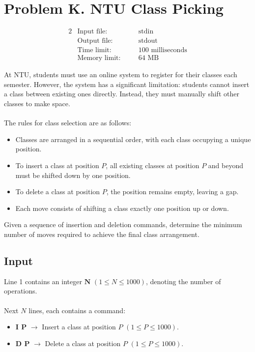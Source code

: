 \documentclass[12pt,a4paper]{article}
\begin{document}
\newpage

\section*{\fontsize{18}{12}Problem K. NTU Class Picking}

\begin{alignat*} {2}
 &   \text{Input file:}   \quad     &&\text{stdin}\\
 &   \text{Output file:}  \quad     &&\text{stdout}\\
 &   \text{Time limit:}   \quad     &&\text{100 milliseconds}\\
 &   \text{Memory limit:} \quad     &&\text{64 MB}
\end{alignat*}

\noindent
At NTU, students must use an online system to register for their classes each semester. However, the system has a significant limitation: students cannot insert a class between existing ones directly. Instead, they must manually shift other classes to make space.
\\\\
\noindent
The rules for class selection are as follows:
\begin{itemize}
    \item Classes are arranged in a sequential order, with each class occupying a unique position.
    \item To insert a class at position \textbf{\( P \)}, all existing classes at position \textbf{\( P \)} and beyond must be shifted down by one position.
    \item To delete a class at position \textbf{\( P \)}, the position remains empty, leaving a gap.
    \item Each move consists of shifting a class exactly one position up or down.
\end{itemize}

\noindent
Given a sequence of insertion and deletion commands, determine the minimum number of moves required to achieve the final class arrangement.

\subsection*{\fontsize{16}{12}Input}
Line 1 contains an integer \(\textbf{N}\) \((1 \leq N \leq 1000)\), denoting the number of operations.
\\\\
\noindent
Next \textbf{\( N \)} lines, each contains a command:
    \begin{itemize}
        \item \textbf{I P} $\rightarrow$ Insert a class at position \( P \) \((1 \leq P \leq 1000)\).
        \item \textbf{D P} $\rightarrow$ Delete a class at position \( P \) \((1 \leq P \leq 1000)\).
    \end{itemize}
\end{document}
